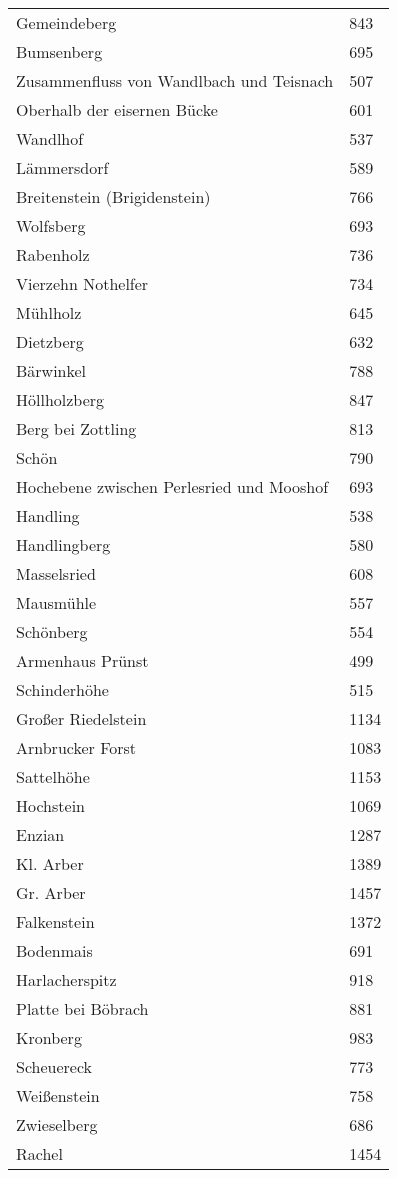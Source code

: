 \documentclass[12pt,a4paper]{book}
\begin{document}
\begin{longtable}{ll}
  Gemeindeberg & 843 \\
  Bumsenberg & 695 \\
  Zusammenfluss von Wandlbach und Teisnach & 507 \\
  Oberhalb der eisernen Bücke & 601 \\
  Wandlhof & 537 \\
  Lämmersdorf & 589 \\
  Breitenstein (Brigidenstein) & 766 \\
  Wolfsberg & 693 \\
  Rabenholz & 736 \\
  Vierzehn Nothelfer & 734 \\
  Mühlholz & 645 \\
  Dietzberg & 632 \\
  Bärwinkel & 788 \\
  Höllholzberg & 847 \\
  Berg bei Zottling & 813 \\
  Schön & 790 \\
  Hochebene zwischen Perlesried und Mooshof & 693 \\
  Handling & 538 \\
  Handlingberg & 580 \\
  Masselsried & 608 \\
  Mausmühle & 557 \\
  Schönberg & 554 \\
  Armenhaus Prünst & 499 \\
  Schinderhöhe & 515 \\
  Großer Riedelstein & 1134 \\
  Arnbrucker Forst & 1083 \\
  Sattelhöhe & 1153 \\
  Hochstein & 1069 \\
  Enzian & 1287 \\
  Kl. Arber & 1389 \\
  Gr. Arber & 1457 \\
  Falkenstein & 1372 \\
  Bodenmais & 691 \\
  Harlacherspitz & 918 \\
  Platte bei Böbrach & 881 \\
  Kronberg & 983 \\
  Scheuereck & 773 \\
  Weißenstein & 758 \\
  Zwieselberg & 686 \\
  Rachel & 1454 \\
\end{longtable}
\end{document}
